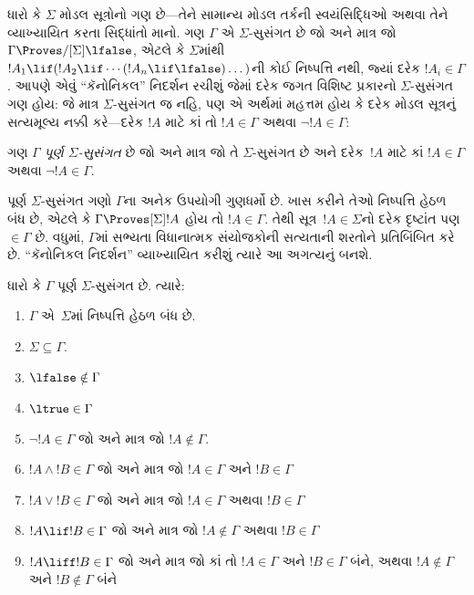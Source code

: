 \label{guunit:OLP-0443}


ધારો કે $\Sigma$ મોડલ સૂત્રોનો ગણ છે—તેને સામાન્ય મોડલ
તર્કની સ્વયંસિદ્ધિઓ અથવા તેને વ્યાખ્યાયિત કરતા સિદ્ધાંતો માનો. ગણ
$\Gamma$ એ $\Sigma$-સુસંગત છે જો અને માત્ર જો $\Gamma
\Proves/[\Sigma] \lfalse$, એટલે કે $\Sigma$માંથી
$!A_1 \lif (!A_2 \lif \cdots (!A_n \lif \lfalse)\dots)$ની કોઈ
નિષ્પત્તિ નથી, જ્યાં દરેક $!A_i \in \Gamma$. આપણે એવું
``કૅનોનિકલ'' નિદર્શન રચીશું જેમાં દરેક જગત વિશિષ્ટ પ્રકારનો
$\Sigma$-સુસંગત ગણ હોય: જે માત્ર $\Sigma$-સુસંગત જ નહિ, પણ એ અર્થમાં
મહત્તમ હોય કે દરેક મોડલ સૂત્રનું સત્યમૂલ્ય નક્કી કરે—દરેક $!A$
માટે કાં તો $!A \in \Gamma$ અથવા $\lnot !A \in \Gamma$:

\begin{defn}
  ગણ $\Gamma$ \emph{પૂર્ણ $\Sigma$-સુસંગત} છે જો અને માત્ર જો તે
  $\Sigma$-સુસંગત છે અને દરેક~$!A$ માટે કાં $!A \in \Gamma$ અથવા
  $\lnot !A \in \Gamma$.
\end{defn}

પૂર્ણ $\Sigma$-સુસંગત ગણો $\Gamma$ના અનેક ઉપયોગી ગુણધર્મો છે.
ખાસ કરીને તેઓ નિષ્પત્તિ હેઠળ બંધ છે, એટલે કે $\Gamma
\Proves[\Sigma] !A$ હોય તો $!A \in \Gamma$. તેથી
સૂત્ર~$!A \in \Sigma$નો દરેક દૃષ્ટાંત પણ
$\in \Gamma$ છે. વધુમાં, $\Gamma$માં સભ્યતા વિધાનાત્મક સંયોજકોની
સત્યતાની શરતોને પ્રતિબિંબિત કરે છે. ``કૅનોનિકલ નિદર્શન'' વ્યાખ્યાયિત
કરીશું ત્યારે આ અગત્યનું બનશે.

\begin{prop}
  ધારો કે $\Gamma$ પૂર્ણ $\Sigma$-સુસંગત છે. ત્યારે:
  \begin{enumerate}
  \item {}%
    $\Gamma$ એ~$\Sigma$માં નિષ્પત્તિ હેઠળ બંધ છે.
  \item {}%
    $\Sigma \subseteq \Gamma$.
  \item {}%
    $\lfalse \notin \Gamma$
  \item {}%
    $\ltrue \in \Gamma$
  \item {}%
    $\lnot!A \in \Gamma$ જો અને માત્ર જો $!A \notin
    \Gamma$.
  \item {}%
    $!A \land !B \in \Gamma$ જો અને માત્ર જો $!A \in \Gamma$ અને
    $!B \in \Gamma$
  \item {}%
    $!A \lor !B \in \Gamma$ જો અને માત્ર જો $!A \in \Gamma$ અથવા
    $!B \in \Gamma$
  \item {}%
    $!A \lif !B \in \Gamma$ જો અને માત્ર જો $!A \notin \Gamma$
    અથવા $!B \in \Gamma$
  \item {}%
    $!A \liff !B \in \Gamma$ જો અને માત્ર જો કાં તો $!A \in \Gamma$
    અને $!B \in \Gamma$ બંને, અથવા $!A \notin \Gamma$ અને
    $!B \notin \Gamma$ બંને
  \end{enumerate}
\end{prop}

